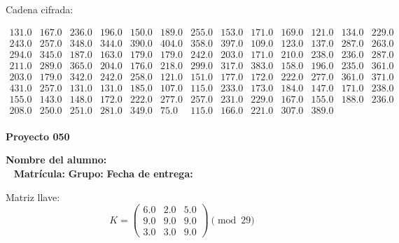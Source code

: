 \documentclass[12pt]{article}
\begin{document}
Cadena cifrada:
\begin{center}
$\begin{array}{lllllllllllll}
131.0 & 167.0 & 236.0 & 196.0 & 150.0 & 189.0 & 255.0 & 153.0 & 171.0 & 169.0 & 121.0 & 134.0 & 229.0\\
243.0 & 257.0 & 348.0 & 344.0 & 390.0 & 404.0 & 358.0 & 397.0 & 109.0 & 123.0 & 137.0 & 287.0 & 263.0\\
294.0 & 345.0 & 187.0 & 163.0 & 179.0 & 179.0 & 242.0 & 203.0 & 171.0 & 210.0 & 238.0 & 236.0 & 287.0\\
211.0 & 289.0 & 365.0 & 204.0 & 176.0 & 218.0 & 299.0 & 317.0 & 383.0 & 158.0 & 196.0 & 235.0 & 361.0\\
203.0 & 179.0 & 342.0 & 242.0 & 258.0 & 121.0 & 151.0 & 177.0 & 172.0 & 222.0 & 277.0 & 361.0 & 371.0\\
431.0 & 257.0 & 131.0 & 131.0 & 185.0 & 107.0 & 115.0 & 233.0 & 173.0 & 184.0 & 147.0 & 171.0 & 238.0\\
155.0 & 143.0 & 148.0 & 172.0 & 222.0 & 277.0 & 257.0 & 231.0 & 229.0 & 167.0 & 155.0 & 188.0 & 236.0\\
208.0 & 250.0 & 251.0 & 281.0 & 349.0 & 75.0 & 115.0 & 166.0 & 221.0 & 307.0 & 389.0\\
\end{array}$
\end{center}

\newpage


\textbf{Proyecto 050}

\textbf{Nombre del alumno:} \underline{\hspace{13cm}}\\\
\vspace{1cm}
\textbf{Matrícula:} \underline{\hspace{4cm}} \hspace{1cm}
\textbf{Grupo:} \underline{\hspace{2cm}}
\textbf{Fecha de entrega:} \underline{\hspace{2cm}}

\medskip

Matriz llave:
\[
K = \begin{pmatrix}
6.0 & 2.0 & 5.0\\
9.0 & 9.0 & 9.0\\
3.0 & 3.0 & 9.0
\end{pmatrix} \pmod{29}
\]
\end{document}
